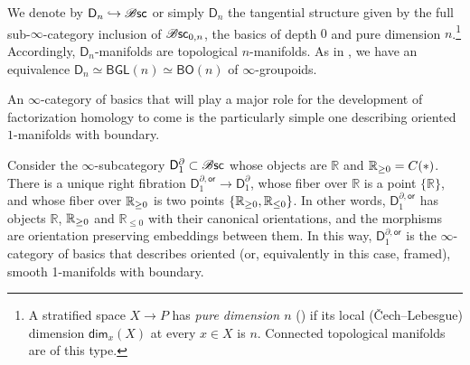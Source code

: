 \documentclass[../text]{subfiles}
\begin{document}
\begin{example}
    We denote by $\mathsf{D}_n\hookrightarrow \mathscr{B} \mathsf{sc}$ or simply $\mathsf{D}_n$ the tangential structure given by the full sub-$\infty$-category inclusion of $\mathscr{B} \mathsf{sc}_{0,n}$, the basics of depth $0$ and pure dimension $n$.\footnote{A stratified space $X\to P$ has \emph{pure dimension $n$} (\cite[Definition 2.4.1]{aft_localstrut}) if its local (\v{C}ech--Lebesgue) dimension $\mathsf{dim}_x(X)$ at every $x\in X$ is $n$. Connected topological manifolds are of this type.} Accordingly, $\mathsf{D}_n$-manifolds are topological $n$-manifolds. As in , we have an equivalence $\mathsf{D}_n\simeq \mathsf{BGL}(n)\simeq \mathsf{BO}(n)$ of $\infty$-groupoids.
\end{example}

An $\infty$-category of basics that will play a major role for the development of factorization homology to come is the particularly simple one describing oriented $1$-manifolds with boundary.

\begin{construction}\label{con:d_1^bor_structure}
    Consider the $\infty$-subcategory $\mathsf{D}_1^{\partial} \subset \mathscr{B} \mathsf{sc}$ whose objects are $\mathbb{R}$ and $\mathbb{R}_{\geq 0}=C(\ast)$. There is a unique right fibration $\mathsf{D}_1^{\partial, \mathsf{or}} \rightarrow \mathsf{D}_1^{\partial}$, whose fiber over $\mathbb{R}$ is a point $\{ \mathbb{R}\}$, and whose fiber over $\mathbb{R}_{\geq 0}$ is two points $\{ \mathbb{R}_{\geq 0}, {\mathbb{R}_{\leq 0}} \}$. In other words, $\mathsf{D}_1^{\partial, \mathsf{or}}$ has objects $\mathbb{R}$, $\mathbb{R}_{\geq 0}$ and $\mathbb{R}_{\leq 0}$ with their canonical orientations, and the morphisms are orientation preserving embeddings between them. In this way, $\mathsf{D}_1^{\partial, \mathsf{or}}$ is the $\infty$-category of basics that describes oriented (or, equivalently in this case, framed), smooth 1-manifolds with boundary.
\end{construction}
\end{document}
